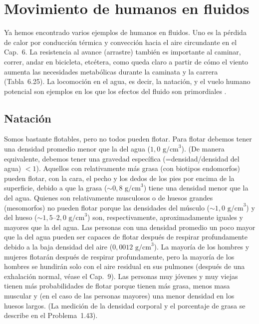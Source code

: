 \documentclass[12pt]{book}
\begin{document}
\section{Movimiento de humanos en fluidos}

Ya hemos encontrado varios ejemplos de humanos en fluidos. Uno es la pérdida de calor por conducción térmica y convección hacia el aire circundante en el Cap.~6. La resistencia al avance (arrastre) también es importante al caminar, correr, andar en bicicleta, etcétera, como queda claro a partir de cómo el viento aumenta las necesidades metabólicas durante la caminata y la carrera (Tabla~6.25). La locomoción en el agua, es decir, la natación, y el vuelo humano potencial son ejemplos en los que los efectos del fluido son primordiales \cite{11}.

\subsection{Natación}

Somos bastante flotables, pero no todos pueden flotar. Para flotar debemos tener una densidad promedio menor que la del agua ($1{,}0\text{ g/cm}^3$). (De manera equivalente, debemos tener una gravedad específica (=densidad/densidad del agua) $<1$). Aquellos con relativamente más grasa (con biotipos endomorfos) pueden flotar, con la cara, el pecho y los dedos de los pies por encima de la superficie, debido a que la grasa (${\sim}0{,}8\text{ g/cm}^3$) tiene una densidad menor que la del agua. Quienes son relativamente musculosos o de huesos grandes (mesomorfos) no pueden flotar porque las densidades del músculo (${\sim}1{,}0\text{ g/cm}^3$) y del hueso (${\sim}1{,}5\text{--}2{,}0\text{ g/cm}^3$) son, respectivamente, aproximadamente iguales y mayores que la del agua. Las personas con una densidad promedio un poco mayor que la del agua pueden ser capaces de flotar después de respirar profundamente debido a la baja densidad del aire ($0{,}0012\text{ g/cm}^3$). La mayoría de los hombres y mujeres flotarán después de respirar profundamente, pero la mayoría de los hombres se hundirán solo con el aire residual en sus pulmones (después de una exhalación normal, véase el Cap.~9). Las personas muy jóvenes y muy viejas tienen más probabilidades de flotar porque tienen más grasa, menos masa muscular y (en el caso de las personas mayores) una menor densidad en los huesos largos. (La medición de la densidad corporal y el porcentaje de grasa se describe en el Problema~1.43).
\end{document}
